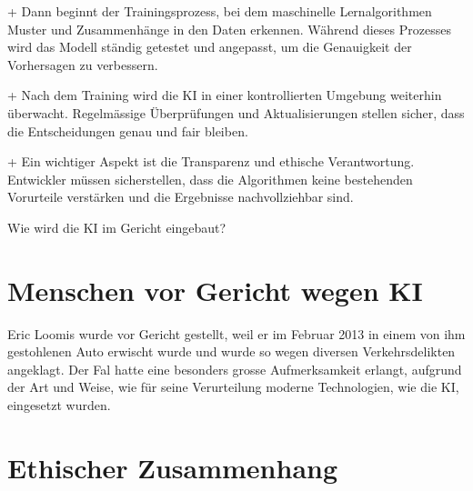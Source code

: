 \documentclass{article}
\begin{document}
+ Dann beginnt der Trainingsprozess, bei dem maschinelle Lernalgorithmen Muster und Zusammenhänge in den 
Daten erkennen. Während dieses Prozesses wird das Modell ständig getestet und angepasst, um die 
Genauigkeit der Vorhersagen zu verbessern.

+ Nach dem Training wird die KI in einer kontrollierten Umgebung weiterhin überwacht. Regelmässige 
Überprüfungen und Aktualisierungen stellen sicher, dass die Entscheidungen genau und fair bleiben.

+ Ein wichtiger Aspekt ist die Transparenz und ethische Verantwortung. Entwickler müssen sicherstellen, 
dass die Algorithmen keine bestehenden Vorurteile verstärken und die Ergebnisse nachvollziehbar sind.

\newline 

Wie wird die KI im Gericht eingebaut?

\section {Menschen vor Gericht wegen KI}

Eric Loomis wurde vor Gericht gestellt, weil er im Februar 2013 in einem von ihm gestohlenen Auto 
erwischt wurde und wurde so wegen diversen Verkehrsdelikten angeklagt. Der Fal hatte eine besonders grosse 
Aufmerksamkeit erlangt, aufgrund der Art und Weise, wie für seine Verurteilung moderne
Technologien, wie die KI, eingesetzt wurden.  


\section {Ethischer Zusammenhang}







\printbibliography
\end{document}
